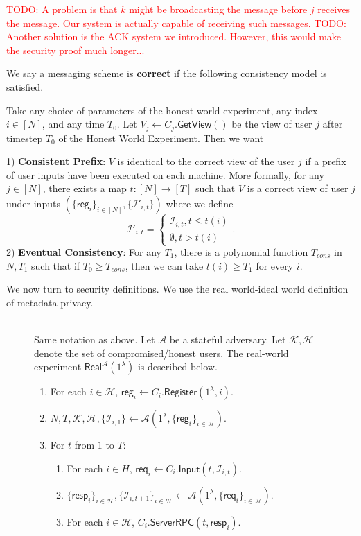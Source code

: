 \documentclass[sigconf, nonacm, balance=false, natbib=false, screen]{acmart}
\newcommand\todo[1]{\textcolor{red}{TODO: #1}}
\newcommand{\reg}{\mathsf{reg}}
\newcommand{\req}{\mathsf{req}}
\newcommand{\resp}{\mathsf{resp}}
\newcommand{\cK}{\mathcal{K}}
\newcommand{\cA}{\mathcal{A}}
\newcommand{\cI}{\mathcal{I}}
\newcommand{\cH}{\mathcal{H}}
\begin{document}
\todo{A problem is that $k$ might be broadcasting the message before $j$ receives the message. Our system is actually capable of receiving such messages.}
\todo{Another solution is the ACK system we introduced. However, this would make the security proof much longer...}
\begin{definition}[Correctness]
 We say a messaging scheme is \textbf{correct} if the following consistency model is satisfied. 
 
 Take any choice of parameters of the honest world experiment, any index $i \in [N]$, and any time $T_0$. Let $V_j \leftarrow C_j.\mathsf{GetView}()$ be the view of user $j$ after timestep $T_0$ of the Honest World Experiment. Then we want

1) \textbf{Consistent Prefix}: $V$ is identical to the correct view of the user $j$ if a prefix of user inputs have been executed on each machine. More formally, for any $j \in [N]$, there exists a map $t: [N] \to [T]$ such that  $V$ is a correct view of user $j$ under inputs $(\{\reg_i\}_{i \in [N]}, \{\cI'_{i, t}\})$
where we define
$$\cI'_{i, t} = \begin{cases}
\cI_{i, t}, t \leq t(i) \\
\emptyset, t > t(i)
\end{cases}.$$
2) \textbf{Eventual Consistency}: For any $T_1$, there is a polynomial function $T_{cons}$ in $N, T_1$ such that if $T_0 \geq T_{cons}$, then we can take $t(i) \geq T_1$ for every $i$.
\end{definition}
We now turn to security definitions. We use the real world-ideal world definition of metadata privacy.
\begin{figure}[h!]
\begin{framed}
\begin{definition} \hfill\\
Same notation as above. Let $\cA$ be a stateful adversary. Let $\cK, \cH$ denote the set of compromised/honest users. The real-world experiment $\mathsf{Real}^{\cA}(1^{\lambda})$ is described below.
\begin{enumerate}
\item For each $i \in \cH$, $\reg_i \leftarrow C_i.\mathsf{Register}(1^{\lambda}, i)$. 
\item $N, T, \cK, \cH, \{\cI_{i, 1}\} \leftarrow \cA(1^{\lambda}, \{\reg_i\}_{i \in \cH})$.
\item For $t$ from $1$ to $T$:
    \begin{enumerate}
    \item For each $i \in H$, $\req_i \leftarrow C_i.\mathsf{Input}(t, \cI_{i, t})$.
    
    \item $\{\resp_i\}_{i \in \cH}, \{\cI_{i, t + 1}\}_{i \in \cH} \leftarrow \cA(1^{\lambda}, \{\req_i\}_{i \in \cH})$.
    
    \item For each $i \in \cH$, $C_i.\mathsf{ServerRPC}(t, \resp_i)$.
    \end{enumerate}
\end{enumerate}
\end{definition}
\end{framed}
\end{figure}
\end{document}

